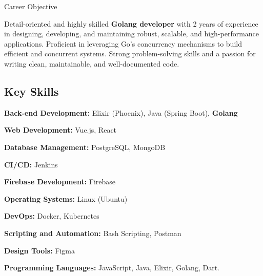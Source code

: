 \documentclass{resume} %
\begin{document}


\begin{rSection}{Career Objective}

    {Detail-oriented and highly skilled \textbf{Golang developer} with 2 years of experience in designing, developing, and maintaining robust, scalable, and high-performance applications. Proficient in leveraging Go's concurrency mechanisms to build efficient and concurrent systems. Strong problem-solving skills and a passion for writing clean, maintainable, and well-documented code.  }
    
\subsection*{Key Skills}

 \hspace{5mm} \textbf{Back-end Development:} Elixir (Phoenix), Java (Spring Boot), \textbf{Golang}

 \hspace{5mm} \textbf{Web Development:} Vue.js, React

 \hspace{5mm} \textbf{Database Management:} PostgreSQL, MongoDB

 \hspace{5mm} \textbf{CI/CD:} Jenkins

 \hspace{5mm} \textbf{Firebase Development:} Firebase

 \hspace{5mm} \textbf{Operating Systems:} Linux (Ubuntu)

 \hspace{5mm} \textbf{DevOps:} Docker, Kubernetes

 \hspace{5mm} \textbf{Scripting and Automation:} Bash Scripting, Postman

 \hspace{5mm} \textbf{Design Tools:} Figma

 \hspace{5mm} \textbf{Programming Languages:} JavaScript, Java, Elixir, Golang, Dart.

\end{rSection}
\end{document}
